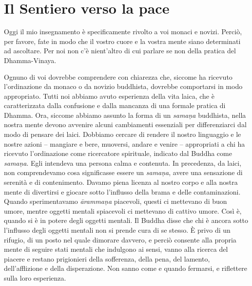 \chapter{Il Sentiero verso la pace}

Oggi il mio insegnamento è specificamente rivolto a voi monaci e novizi.
Perciò, per favore, fate in modo che il vostro cuore e la vostra mente
siano determinati ad ascoltare. Per noi non c'è nient'altro di cui
parlare se non della pratica del Dhamma-Vinaya.

Ognuno di voi dovrebbe comprendere con chiarezza che, siccome ha
ricevuto l'ordinazione da monaco o da novizio buddhista, dovrebbe
comportarsi in modo appropriato. Tutti noi abbiamo avuto esperienza
della vita laica, che è caratterizzata dalla confusione e dalla mancanza
di una formale pratica di Dhamma. Ora, siccome abbiamo assunto la forma
di un \emph{samaṇa} buddhista, nella nostra mente devono avvenire alcuni
cambiamenti essenziali per differenziarci dal modo di pensare dei laici.
Dobbiamo cercare di rendere il nostro linguaggio e le nostre azioni --
mangiare e bere, muoversi, andare e venire -- appropriati a chi ha
ricevuto l'ordinazione come ricercatore spirituale, indicato dal Buddha
come \emph{samaṇa}. Egli intendeva una persona calma e contenuta. In
precedenza, da laici, non comprendevamo cosa significasse essere un
\emph{samaṇa}, avere una sensazione di serenità e di contenimento.
Davamo piena licenza al nostro corpo e alla nostra mente di divertirsi e
giocare sotto l'influsso della brama e delle contaminazioni. Quando
sperimentavamo \emph{ārammaṇa} piacevoli, questi ci mettevano di buon
umore, mentre oggetti mentali spiacevoli ci mettevano di cattivo umore.
Così è, quando si è in potere degli oggetti mentali. Il Buddha disse che
chi è ancora sotto l'influsso degli oggetti mentali non si prende cura
di se stesso. È privo di un rifugio, di un posto nel quale dimorare
davvero, e perciò consente alla propria mente di seguire stati mentali
che indulgono ai sensi, vanno alla ricerca del piacere e restano
prigionieri della sofferenza, della pena, del lamento, dell'afflizione e
della disperazione. Non sanno come e quando fermarsi, e riflettere sulla
loro esperienza.

